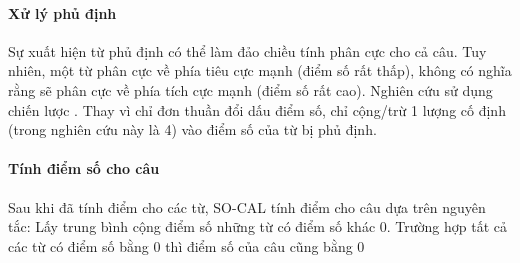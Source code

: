 \paragraph*{Xử lý phủ định}
Sự xuất hiện từ phủ định có thể làm đảo chiều tính phân cực cho cả câu. Tuy nhiên, một từ phân cực về phía tiêu cực mạnh (điểm số rất thấp), không có nghĩa rằng sẽ phân cực về phía tích cực mạnh (điểm số rất cao). Nghiên cứu \cite{taboada2011lexicon} sử dụng chiến lược . Thay vì chỉ đơn thuần đổi dấu điểm số,  chỉ cộng/trừ 1 lượng cố định (trong nghiên cứu này là 4) vào điểm số của từ bị phủ định.\\


\paragraph*{Tính điểm số cho câu}
Sau khi đã tính điểm cho các từ, SO-CAL tính điểm cho câu dựa trên nguyên tắc: Lấy trung bình cộng điểm số những từ có điểm số khác 0. Trường hợp tất cả các từ có điểm số bằng 0 thì điểm số của câu cũng bằng 0
